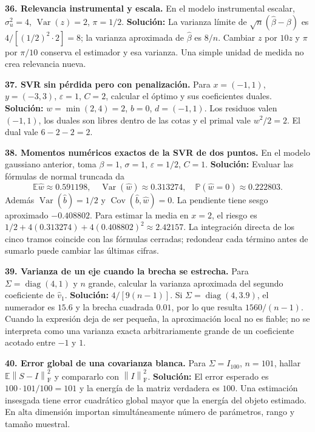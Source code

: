 \documentclass[11pt,a4paper]{article}
\newcommand{\E}{\mathbb E}
\newcommand{\Prob}{\mathbb P}
\newcommand{\norm}[1]{\left\lVert #1\right\rVert}
\DeclareMathOperator{\Var}{Var}
\DeclareMathOperator{\Cov}{Cov}
\DeclareMathOperator{\diag}{diag}
\newcommand{\F}{_{\mathrm F}}
\theoremstyle{definition}
\begin{document}
\textbf{36. Relevancia instrumental y escala.} En el modelo instrumental escalar, $\sigma_u^2=4$, $\Var(z)=2$, $\pi=1/2$.\quad
\textbf{Solución:} La varianza límite de $\sqrt n(\widehat\beta-\beta)$ es $4/[(1/2)^2\cdot2]=8$; la varianza aproximada de $\widehat\beta$ es $8/n$. Cambiar $z$ por $10z$ y $\pi$ por $\pi/10$ conserva el estimador y esa varianza. Una simple unidad de medida no crea relevancia nueva.

\textbf{37. SVR sin pérdida pero con penalización.} Para $x=(-1,1)$, $y=(-3,3)$, $\varepsilon=1$, $C=2$, calcular el óptimo y sus coeficientes duales.\quad
\textbf{Solución:} $w=\min(2,4)=2$, $b=0$, $d=(-1,1)$. Los residuos valen $(-1,1)$, los duales son libres dentro de las cotas y el primal vale $w^2/2=2$. El dual vale $6-2-2=2$.

\textbf{38. Momentos numéricos exactos de la SVR de dos puntos.} En el modelo gaussiano anterior, toma $\beta=1$, $\sigma=1$, $\varepsilon=1/2$, $C=1$.\quad
\textbf{Solución:} Evaluar las fórmulas de normal truncada da
\[
\E\widehat w\approx0.591198,\quad\Var(\widehat w)\approx0.313274,
\quad\Prob(\widehat w=0)\approx0.222803.
\]
Además $\Var(\widehat b)=1/2$ y $\Cov(\widehat b,\widehat w)=0$. La pendiente tiene sesgo aproximado $-0.408802$. Para estimar la media en $x=2$, el riesgo es $1/2+4(0.313274)+4(0.408802)^2\approx2.42157$. La integración directa de los cinco tramos coincide con las fórmulas cerradas; redondear cada término antes de sumarlo puede cambiar las últimas cifras.

\textbf{39. Varianza de un eje cuando la brecha se estrecha.} Para $\Sigma=\diag(4,1)$ y $n$ grande, calcular la varianza aproximada del segundo coeficiente de $\widehat v_1$.\quad
\textbf{Solución:} $4/[9(n-1)]$. Si $\Sigma=\diag(4,3.9)$, el numerador es $15.6$ y la brecha cuadrada $0.01$, por lo que resulta $1560/(n-1)$. Cuando la expresión deja de ser pequeña, la aproximación local no es fiable; no se interpreta como una varianza exacta arbitrariamente grande de un coeficiente acotado entre $-1$ y $1$.

\textbf{40. Error global de una covarianza blanca.} Para $\Sigma=I_{100}$, $n=101$, hallar $\E\norm{S-I}\F^2$ y compararlo con $\norm I\F^2$.\quad
\textbf{Solución:} El error esperado es $100\cdot101/100=101$ y la energía de la matriz verdadera es $100$. Una estimación insesgada tiene error cuadrático global mayor que la energía del objeto estimado. En alta dimensión importan simultáneamente número de parámetros, rango y tamaño muestral.
\end{document}
